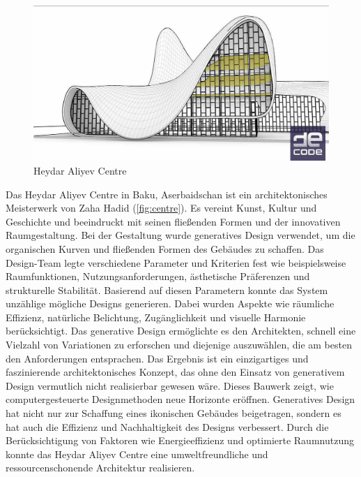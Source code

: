 \begin{figure}[h]
    \begin{minipage}{0.5\textwidth}
      \centering
      \includegraphics[width=\textwidth]{./images/DE_Rh_lvl1_baku.jpg}
    \end{minipage}
    \caption{Heydar Aliyev Centre}
    \label{fig:centre}
  \end{figure}

Das Heydar Aliyev Centre in Baku, Aserbaidschan ist ein architektonisches Meisterwerk von Zaha Hadid (\autoref{fig:centre}). Es vereint Kunst, Kultur und Geschichte und beeindruckt mit seinen fließenden Formen und der innovativen Raumgestaltung. 
Bei der Gestaltung wurde generatives Design verwendet, um die organischen Kurven und fließenden Formen des Gebäudes zu schaffen. Das Design-Team legte verschiedene Parameter und Kriterien fest wie beispielsweise Raumfunktionen, Nutzungsanforderungen, ästhetische Präferenzen und strukturelle Stabilität. 
Basierend auf diesen Parametern konnte das System unzählige mögliche Designs generieren. Dabei wurden Aspekte wie räumliche Effizienz, natürliche Belichtung, Zugänglichkeit und visuelle Harmonie berücksichtigt. Das generative Design ermöglichte es den Architekten, schnell eine Vielzahl von Variationen zu erforschen und diejenige auszuwählen, die am besten den Anforderungen entsprachen. 
Das Ergebnis ist ein einzigartiges und faszinierende architektonisches Konzept, das ohne den Einsatz von generativem Design vermutlich nicht realisierbar gewesen wäre. Dieses Bauwerk zeigt, wie computergesteuerte Designmethoden neue Horizonte eröffnen. 
Generatives Design hat nicht nur zur Schaffung eines ikonischen Gebäudes beigetragen, sondern es hat auch die Effizienz und Nachhaltigkeit des Designs verbessert. Durch die Berücksichtigung von Faktoren wie Energieeffizienz und optimierte Raumnutzung konnte das Heydar Aliyev Centre eine umweltfreundliche und ressourcenschonende Architektur realisieren. \autocite*{5}
